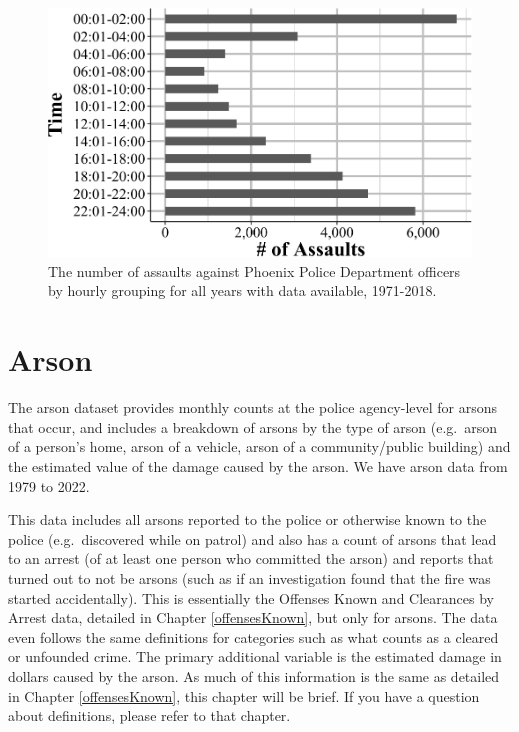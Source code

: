 \documentclass[
  12pt,
  openany]{book}
\begin{document}
\begin{figure}

{\centering \includegraphics[width=0.9\linewidth]{07_leoka_files/figure-latex/phoenixAssaultTimes-1} 

}

\caption{The number of assaults against Phoenix Police Department officers by hourly grouping for all years with data available, 1971-2018.}\label{fig:phoenixAssaultTimes}
\end{figure}

\chapter{Arson}\label{arsonChapter}

The arson dataset provides monthly counts at the police agency-level for arsons that occur, and includes a breakdown of arsons by the type of arson (e.g.~arson of a person's home, arson of a vehicle, arson of a community/public building) and the estimated value of the damage caused by the arson. We have arson data from 1979 to 2022.

This data includes all arsons reported to the police or otherwise known to the police (e.g.~discovered while on patrol) and also has a count of arsons that lead to an arrest (of at least one person who committed the arson) and reports that turned out to not be arsons (such as if an investigation found that the fire was started accidentally). This is essentially the Offenses Known and Clearances by Arrest data, detailed in Chapter \ref{offensesKnown}, but only for arsons. The data even follows the same definitions for categories such as what counts as a cleared or unfounded crime. The primary additional variable is the estimated damage in dollars caused by the arson. As much of this information is the same as detailed in Chapter \ref{offensesKnown}, this chapter will be brief. If you have a question about definitions, please refer to that chapter.
\end{document}
